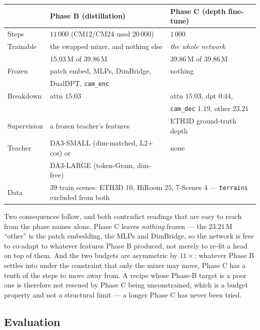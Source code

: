 \documentclass[11pt,a4paper]{article}
\begin{document}
\begin{center}
\begin{tabular}{lll}
\toprule
 & \textbf{Phase B} (distillation) & \textbf{Phase C} (depth fine-tune) \\
\midrule
Steps        & $11\,000$ (CM12/CM24 used $20\,000$) & $1\,000$ \\
Trainable    & the swapped mixer, and nothing else  & \emph{the whole network} \\
             & $15.03$\,M of $39.86$\,M             & $39.86$\,M of $39.86$\,M \\
Frozen       & patch embed, MLPs, DimBridge,        & nothing \\
             & DualDPT, \texttt{cam\_enc}           & \\
Breakdown    & attn $15.03$                          & attn $15.03$, dpt $0.44$, \\
             &                                       & \texttt{cam\_dec} $1.19$, other $23.21$ \\
Supervision  & a frozen teacher's features           & ETH3D ground-truth depth \\
Teacher      & DA3-SMALL (dim-matched, L2$+$cos) or  & none \\
             & DA3-LARGE (token-Gram, dim-free)      & \\
Data         & \multicolumn{2}{l}{$39$ train scenes: ETH3D $10$, HiRoom $25$, 7-Scenes $4$
                 --- \texttt{terrains} excluded from both} \\
\bottomrule
\end{tabular}
\end{center}

\noindent Two consequences follow, and both contradict readings that are easy to
reach from the phase names alone. Phase C leaves \emph{nothing} frozen --- the
$23.21$\,M ``other'' is the patch embedding, the MLPs and DimBridge, so the
network is free to co-adapt to whatever features Phase B produced, not merely to
re-fit a head on top of them. And the two budgets are asymmetric by $11\times$:
whatever Phase B settles into under the constraint that only the mixer may move,
Phase C has a tenth of the steps to move away from. A recipe whose Phase-B target
is a poor one is therefore not rescued by Phase C being unconstrained, which is a
budget property and not a structural limit --- a longer Phase C has never been
tried.

\subsection{Evaluation}
\label{sec:eth3d-depth-eval}
\end{document}
